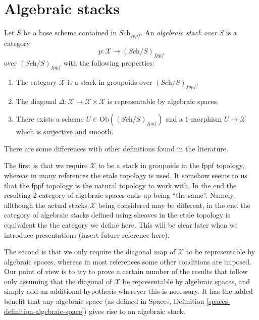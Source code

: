 \section{Algebraic stacks}
\label{section-algebraic-stacks}

\begin{definition}
\label{definition-algebraic-stack}
Let $S$ be a base scheme contained in $\textit{Sch}_{fppf}$.
An {\it algebraic stack over $S$} is a category
$$
p : \mathcal{X} \to (\textit{Sch}/S)_{fppf}
$$
over $(\textit{Sch}/S)_{fppf}$ with the following properties:
\begin{enumerate}
\item The category $\mathcal{X}$ is a stack in groupoids over
$(\textit{Sch}/S)_{fppf}$.
\item The diagonal
$\Delta : \mathcal{X} \to \mathcal{X}\times\mathcal{X}$
is representable by algebraic spaces.
\item There exists a scheme $U \in \text{Ob}((\textit{Sch}/S)_{fppf})$
and a $1$-morphism $U \to \mathcal{X}$ which is surjective and smooth.
\end{enumerate}
\end{definition}

\noindent
There are some differences with other definitions found in the literature.

\medskip\noindent
The first is that we require $\mathcal{X}$ to be a stack in groupoids
in the fppf topology, whereas in many references the etale topology is
used. It somehow seems to us that the fppf topology is the natural topology
to work with. In the end the resulting $2$-category of algebraic spaces
ends up being ``the same''. Namely, allthough the actual
stacks $\mathcal{X}$ being considered may be different, in the end the
category of algebraic stacks defined using sheaves in the etale topology
is equivalent the the category we define here. This will be clear later
when we introduce presentations (insert future reference here).

\medskip\noindent
The second is that we only require the diagonal map of $\mathcal{X}$ to be
representable by algebraic spaces, whereas in most references some other
conditions are imposed. Our point of view is to try to prove a certain
number of the results that follow only assuming that the diagonal
of $\mathcal{X}$ be representable by algebraic spaces, and simply add
an additional hypothesis wherever this is necessary. It has the added
benefit that any algebraic space (as defined in
Spaces, Definition \ref{spaces-definition-algebraic-space})
gives rise to an algebraic stack.

